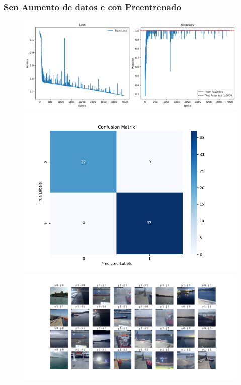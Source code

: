 \documentclass{article}
\begin{document}
\subsubsection{Sen Aumento de datos e con Preentrenado}
\begin{figure}[H]
    \centering
    \begin{minipage}{0.55\textwidth}
        \centering
        \includegraphics[width=\linewidth]{../ultimas_figuras/LOSS__A_False_P_True_D_False_MLP_True_efficientnet_b4.png}
    \end{minipage}
    \begin{minipage}{0.3\textwidth}
        \centering
        \includegraphics[width=\linewidth]{../ultimas_figuras/CM__A_False_P_True_D_False_MLP_True_efficientnet_b4.png}
    \end{minipage}
    \begin{minipage}{0.7\textwidth}
        \centering
        \includegraphics[width=\linewidth]{../ultimas_figuras/GRID__A_False_P_True_D_False_MLP_True_efficientnet_b4.png}
    \end{minipage}
\end{figure}
\end{document}
